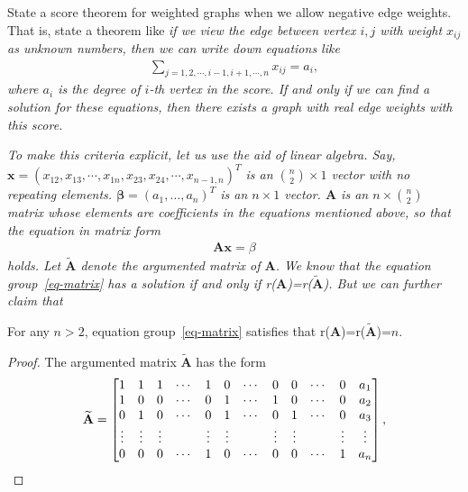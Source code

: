 \documentclass[12pt,a4]{article}
\begin{document}
\begin{exercise}
  State a score theorem for weighted graphs when we allow
  negative edge weights. That is, state a theorem like \emph{if we view the edge between vertex $i,j$ with weight $x_{ij}$ as unknown numbers, then we can write down equations like}
  \begin{align*}
    \sum_{j=1,2,\cdots,i-1,i+1,\cdots,n}x_{ij}=a_i,
  \end{align*}
\emph{where $a_i$ is the degree of $i$-th vertex in the score. If and only if we can find a solution for these equations, then there exists a graph with real edge weights with this score.}

\emph{To make this criteria explicit, let us use the aid of linear algebra. Say, $\mathbf{x}=(x_{12},x_{13},\cdots,x_{1n},x_{23},x_{24},\cdots,x_{n-1,n})^T$ is an ${n \choose 2}\times 1$ vector with no repeating elements. $\mathbf{\beta}=(a_1,\dots,a_n)^T$ is an $n\times 1$ vector. $\mathbf{A}$ is an $n\times {n\choose 2}$ matrix whose elements are coefficients in the equations mentioned above, so that the equation in matrix form}
\begin{align}\label{eq-matrix}
  \mathbf{Ax}=\beta
\end{align}
\emph{holds. Let $\widetilde{\mathbf{A}}$ denote the argumented matrix of $\mathbf{A}$. We know that the equation group~\eqref{eq-matrix} has a solution if and only if \textnormal{r($\mathbf{A}$)=r($\mathbf{\widetilde{A}}$)}. But we can further claim that}
\begin{lemma}\label{lem-fullrank}
  For any $n>2$, equation group~\eqref{eq-matrix} satisfies that \textnormal{r($\mathbf{A}$)=r($\mathbf{\widetilde{A}}$)}=$n$.
\end{lemma}
\begin{proof}
  The argumented matrix $\mathbf{\widetilde{A}}$ has the form\begin{align*}
    \setcounter{MaxMatrixCols}{14}
    \mathbf{\widetilde{A}}=
    \begin{matrix}
         \begin{bmatrix}
        1&1&1&\cdots&1&0&\cdots&0&0&\cdots&0&a_1\\
        1&0&0&\cdots&0&1&\cdots&1&0&\cdots&0&a_2\\
        0&1&0&\cdots&0&1&\cdots&0&1&\cdots&0&a_3\\
        \vdots&\vdots&\vdots&&\vdots&\vdots&&\vdots&\vdots&&\vdots&\vdots\\
        0&0&0&\cdots&1&0&\cdots&0&0&\cdots&1&a_n
      \end{bmatrix},
    \end{matrix}
  \end{align*}
  

\end{proof}
\end{exercise}
\end{document}

